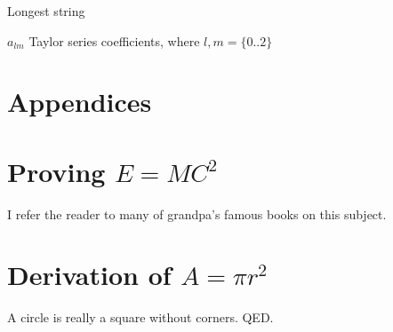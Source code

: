 \documentclass[botnum, fleqn]{unmeethesis}
\begin{document}
  \tableofcontents
  \listoffigures
  \listoftables

  \begin{glossary}{Longest  string}
    \item[$a_{lm}$]
    Taylor series coefficients, where $l,m = \{0..2\}$
  \end{glossary}

  \mainmatter

  
  
  

  \chapter*{Appendices}


  \appendix
  \chapter{Proving $E=MC^2$}
  I refer the reader to many of grandpa's famous books on this subject.
  \chapter{Derivation of $A = \pi r^2$}
  A circle is really a square without corners.  QED.

  
  
\end{document}
